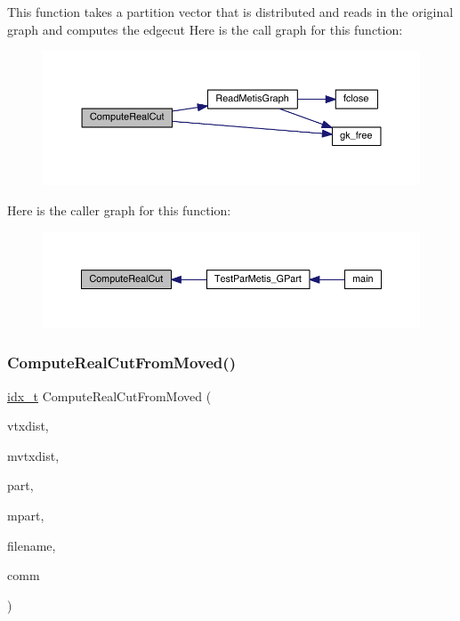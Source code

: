 This function takes a partition vector that is distributed and reads in the original graph and computes the edgecut Here is the call graph for this function\+:\nopagebreak
\begin{figure}[H]
\begin{center}
\leavevmode
\includegraphics[width=350pt]{a00954_ae14ac8abf0f0bad98a84d811ae23cf7a_cgraph}
\end{center}
\end{figure}
Here is the caller graph for this function\+:\nopagebreak
\begin{figure}[H]
\begin{center}
\leavevmode
\includegraphics[width=350pt]{a00954_ae14ac8abf0f0bad98a84d811ae23cf7a_icgraph}
\end{center}
\end{figure}
\mbox{\label{a00954_a5e1fe783f0bb3f52b2996b256900bfff}} 
\subsubsection{\texorpdfstring{Compute\+Real\+Cut\+From\+Moved()}{ComputeRealCutFromMoved()}}
{\footnotesize\ttfamily \hyperlink{a00876_aaa5262be3e700770163401acb0150f52}{idx\+\_\+t} Compute\+Real\+Cut\+From\+Moved (\begin{DoxyParamCaption}\item[{\hyperlink{a00876_aaa5262be3e700770163401acb0150f52}{idx\+\_\+t} $\ast$}]{vtxdist,  }\item[{\hyperlink{a00876_aaa5262be3e700770163401acb0150f52}{idx\+\_\+t} $\ast$}]{mvtxdist,  }\item[{\hyperlink{a00876_aaa5262be3e700770163401acb0150f52}{idx\+\_\+t} $\ast$}]{part,  }\item[{\hyperlink{a00876_aaa5262be3e700770163401acb0150f52}{idx\+\_\+t} $\ast$}]{mpart,  }\item[{char $\ast$}]{filename,  }\item[{M\+P\+I\+\_\+\+Comm}]{comm }\end{DoxyParamCaption})}

